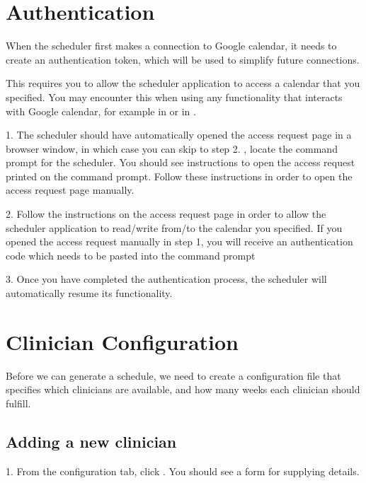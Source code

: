 \documentclass[letterpaper,10pt,english]{sphinxmanual}
\begin{document}
\section{Authentication}
\label{\detokenize{index:authentication}}\label{\detokenize{index:id1}}
When the scheduler first makes a connection to Google calendar, it needs
to create an authentication token, which will be used to simplify future
connections.

This requires you to allow the scheduler application to access a calendar
that you specified. You may encounter this when using any functionality that
interacts with Google calendar, for example in {\hyperref[\detokenize{index:generating-a-schedule}]{}}
or in {\hyperref[\detokenize{index:publishing-a-schedule-to-google-calendar}]{}}.

1. The scheduler should have automatically opened the access request page
in a browser window, in which case you can skip to step 2. ,
locate the command prompt for the scheduler. You should see instructions
to open the access request printed on the command prompt. Follow these instructions
in order to open the access request page manually.

2. Follow the instructions on the access request page in order to allow
the scheduler application to read/write from/to the calendar you specified.
 If you opened the access request manually in step 1, you will
receive an authentication code which needs to be pasted into the command prompt

3. Once you have completed the authentication process, the scheduler will
automatically resume its functionality.


\section{Clinician Configuration}
\label{\detokenize{index:clinician-configuration}}\label{\detokenize{index:id2}}
Before we can generate a schedule, we need to create a configuration file
that specifies which clinicians are available, and how many weeks each
clinician should fulfill.


\subsection{Adding a new clinician}
\label{\detokenize{index:adding-a-new-clinician}}
1. From the configuration tab, click . You should see a
form for supplying details.
\end{document}
